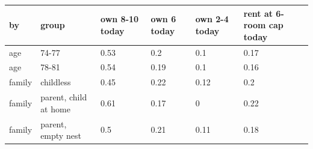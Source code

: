 \begingroup\small
\setlength{\tabcolsep}{3pt}
\renewcommand{\arraystretch}{1.04}
\begin{tabularx}{\linewidth}{XXXXXX}
\toprule
by & group & own 8-10 today & own 6 today & own 2-4 today & rent at 6-room cap today \\
\midrule
age & 74-77 & 0.53 & 0.2 & 0.1 & 0.17 \\
age & 78-81 & 0.54 & 0.19 & 0.1 & 0.16 \\
family & childless & 0.45 & 0.22 & 0.12 & 0.2 \\
family & parent, child at home & 0.61 & 0.17 & 0 & 0.22 \\
family & parent, empty nest & 0.5 & 0.21 & 0.11 & 0.18 \\
\bottomrule
\end{tabularx}
\endgroup
